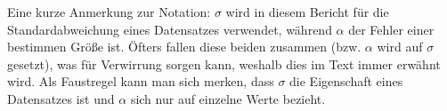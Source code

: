 Eine kurze Anmerkung zur Notation: \( \sigma \) wird in diesem Bericht für die Standardabweichung eines Datensatzes verwendet, während \( \alpha \) der Fehler einer bestimmen Größe ist. Öfters fallen diese beiden zusammen (bzw. \( \alpha \) wird auf \( \sigma \) gesetzt), was für Verwirrung sorgen kann, weshalb dies im Text immer erwähnt wird.
Als Faustregel kann man sich merken, dass \( \sigma \) die Eigenschaft eines Datensatzes ist und \( \alpha \) sich nur auf einzelne Werte bezieht.

